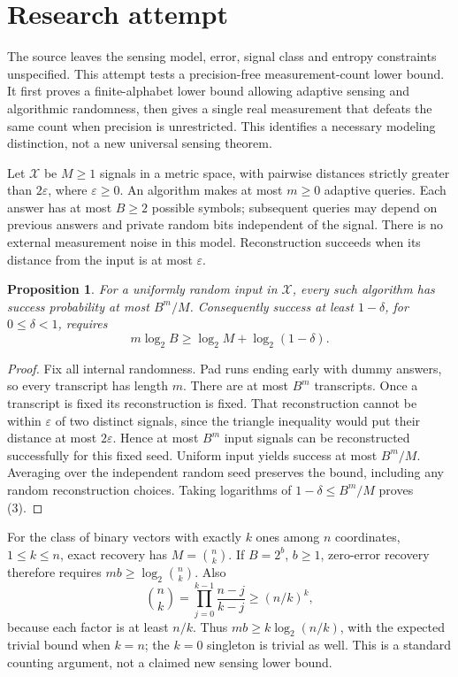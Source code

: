 \documentclass[11pt]{article}
\newtheorem{proposition}{Proposition}
\begin{document}
\section{Research attempt}
The source leaves the sensing model, error, signal class and entropy constraints unspecified. This attempt tests a precision-free measurement-count lower bound. It first proves a finite-alphabet lower bound allowing adaptive sensing and algorithmic randomness, then gives a single real measurement that defeats the same count when precision is unrestricted. This identifies a necessary modeling distinction, not a new universal sensing theorem.

Let $\mathcal X$ be $M\ge1$ signals in a metric space, with pairwise distances strictly greater than $2\varepsilon$, where $\varepsilon\ge0$. An algorithm makes at most $m\ge0$ adaptive queries. Each answer has at most $B\ge2$ possible symbols; subsequent queries may depend on previous answers and private random bits independent of the signal. There is no external measurement noise in this model. Reconstruction succeeds when its distance from the input is at most $\varepsilon$.

\begin{proposition}
For a uniformly random input in $\mathcal X$, every such algorithm has success probability at most $B^m/M$. Consequently success at least $1-\delta$, for $0\le\delta<1$, requires
\[
 m\log_2B\ge\log_2 M+\log_2(1-\delta). \tag{3}
\]
\end{proposition}
\begin{proof}
Fix all internal randomness. Pad runs ending early with dummy answers, so every transcript has length $m$. There are at most $B^m$ transcripts. Once a transcript is fixed its reconstruction is fixed. That reconstruction cannot be within $\varepsilon$ of two distinct signals, since the triangle inequality would put their distance at most $2\varepsilon$. Hence at most $B^m$ input signals can be reconstructed successfully for this fixed seed. Uniform input yields success at most $B^m/M$. Averaging over the independent random seed preserves the bound, including any random reconstruction choices. Taking logarithms of $1-\delta\le B^m/M$ proves (3).
\end{proof}

For the class of binary vectors with exactly $k$ ones among $n$ coordinates, $1\le k\le n$, exact recovery has $M=\binom nk$. If $B=2^b$, $b\ge1$, zero-error recovery therefore requires $mb\ge\log_2\binom nk$. Also
\[
 \binom nk=\prod_{j=0}^{k-1}\frac{n-j}{k-j}\ge(n/k)^k,
\]
because each factor is at least $n/k$. Thus $mb\ge k\log_2(n/k)$, with the expected trivial bound when $k=n$; the $k=0$ singleton is trivial as well. This is a standard counting argument, not a claimed new sensing lower bound.
\end{document}

